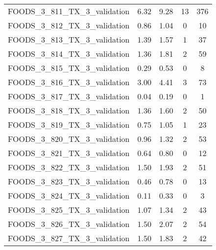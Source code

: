 \begin{table}
\begin{tabular}{|l|c|c|c|c|}
FOODS\_3\_811\_TX\_3\_validation & 6.32 & 9.28 & 13 & 376 \\
FOODS\_3\_812\_TX\_3\_validation & 0.86 & 1.04 & 0 & 10 \\
FOODS\_3\_813\_TX\_3\_validation & 1.39 & 1.57 & 1 & 37 \\
FOODS\_3\_814\_TX\_3\_validation & 1.36 & 1.81 & 2 & 59 \\
FOODS\_3\_815\_TX\_3\_validation & 0.29 & 0.53 & 0 & 8 \\
FOODS\_3\_816\_TX\_3\_validation & 3.00 & 4.41 & 3 & 73 \\
FOODS\_3\_817\_TX\_3\_validation & 0.04 & 0.19 & 0 & 1 \\
FOODS\_3\_818\_TX\_3\_validation & 1.36 & 1.60 & 2 & 50 \\
FOODS\_3\_819\_TX\_3\_validation & 0.75 & 1.05 & 1 & 23 \\
FOODS\_3\_820\_TX\_3\_validation & 0.96 & 1.32 & 2 & 53 \\
FOODS\_3\_821\_TX\_3\_validation & 0.64 & 0.80 & 0 & 12 \\
FOODS\_3\_822\_TX\_3\_validation & 1.50 & 1.93 & 2 & 51 \\
FOODS\_3\_823\_TX\_3\_validation & 0.46 & 0.78 & 0 & 13 \\
FOODS\_3\_824\_TX\_3\_validation & 0.11 & 0.33 & 0 & 3 \\
FOODS\_3\_825\_TX\_3\_validation & 1.07 & 1.34 & 2 & 43 \\
FOODS\_3\_826\_TX\_3\_validation & 1.50 & 2.07 & 2 & 54 \\
FOODS\_3\_827\_TX\_3\_validation & 1.50 & 1.83 & 2 & 42 \\
\bottomrule
\end{tabular}
\end{table}

